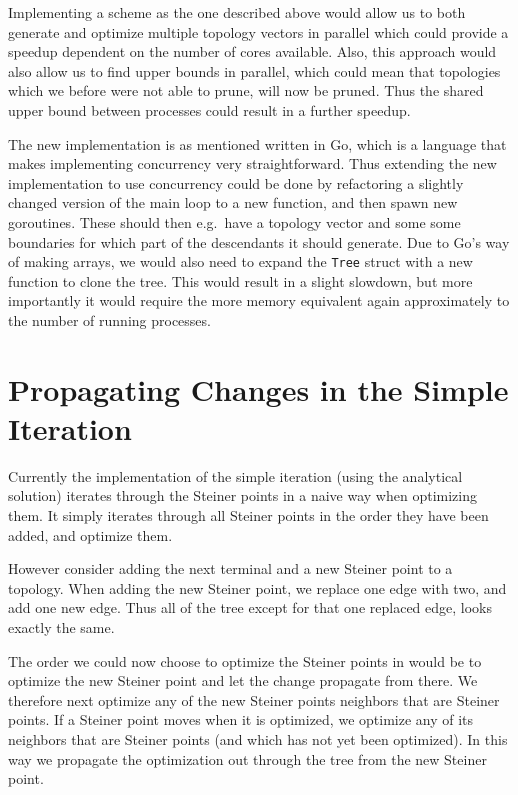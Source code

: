 Implementing a scheme as the one described above would allow us to both generate
and optimize multiple topology vectors in parallel which could provide a speedup
dependent on the number of cores available. Also, this approach would also
allow us to find upper bounds in parallel, which could mean that topologies
which we before were not able to prune, will now be pruned. Thus the shared
upper bound between processes could result in a further speedup.

The new implementation is as mentioned written in Go, which is a language that
makes implementing concurrency very straightforward. Thus extending the new implementation to
use concurrency could be done by refactoring a slightly changed version of
the main loop to a new function, and then spawn new goroutines. These should
then e.g.\ have a topology vector and some some boundaries for which part of the
descendants it should generate. Due to Go's way of making arrays, we would also
need to expand the \texttt{Tree} struct with a new function to clone the tree.
This would result in a slight slowdown, but more importantly it would require
the more memory equivalent again approximately to the number of running
processes.

\section{Propagating Changes in the Simple Iteration}
\label{sec:prop-chang-simple}

Currently the implementation of the simple iteration (using the analytical
solution) iterates through the Steiner points in a naive way when optimizing
them. It simply iterates through all Steiner points in the order they have been
added, and optimize them.

However consider adding the next terminal and a new Steiner point to a
topology. When adding the new Steiner point, we replace one edge with two, and
add one new edge. Thus all of the tree except for that one replaced edge, looks
exactly the same.

The order we could now choose to optimize the Steiner points in would be to
optimize the new Steiner point and let the change propagate from there. We
therefore next optimize any of the new Steiner points neighbors that are Steiner
points. If a Steiner point moves when it is optimized, we optimize any of
its neighbors that are Steiner points (and which has not yet been optimized). In
this way we propagate the optimization out through the tree from the new Steiner
point.

